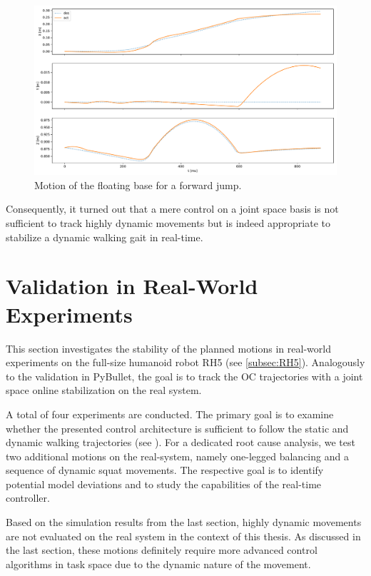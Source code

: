 \begin{figure}[h!]
\centering	
\includegraphics[width=.85\textwidth]{fig/jumpForward/pybullet/pybulletBase}
\caption[Motion of the floating base for a forward jump]{Motion of the floating base for a forward jump.}
\label{fig:jumpForward_pybulletBase}
\end{figure}

Consequently, it turned out that a mere control on a joint space basis is not sufficient to track highly dynamic movements but is indeed appropriate to stabilize a dynamic walking gait in real-time. 


\section{Validation in Real-World Experiments}\label{sec:OnlineExperiments}
This section investigates the stability of the planned motions in real-world experiments on the full-size humanoid robot RH5 (see \cref{subsec:RH5}). Analogously to the validation in PyBullet, the goal is to track the \gls{OC} trajectories with a joint space online stabilization on the real system. 

A total of four experiments are conducted. The primary goal is to examine whether the presented control architecture is sufficient to follow the static and dynamic walking trajectories (see ). For a dedicated root cause analysis, we test two additional motions on the real-system, namely one-legged balancing and a sequence of dynamic squat movements. The respective goal is to identify potential model deviations and to study the capabilities of the real-time controller.

Based on the simulation results from the last section, highly dynamic movements are not evaluated on the real system in the context of this thesis. As discussed in the last section, these motions definitely require more advanced control algorithms in task space due to the dynamic nature of the movement. 

